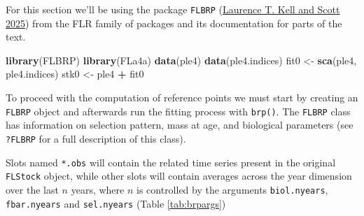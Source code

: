 \documentclass[
]{book}
\newenvironment{Shaded}{\begin{snugshade}}{\end{snugshade}}
\newcommand{\FunctionTok}[1]{\textcolor[rgb]{0.13,0.29,0.53}{\textbf{#1}}}
\newcommand{\NormalTok}[1]{#1}
\newcommand{\OtherTok}[1]{\textcolor[rgb]{0.56,0.35,0.01}{#1}}
\newcommand{\SpecialCharTok}[1]{\textcolor[rgb]{0.81,0.36,0.00}{\textbf{#1}}}
\begin{document}
For this section we'll be using the package \texttt{FLBRP} (\protect\hyperlink{ref-flbrp}{Laurence T. Kell and Scott 2025}) from the FLR family of packages and its documentation for parts of the text.

\begin{Shaded}
\begin{Highlighting}[]
\FunctionTok{library}\NormalTok{(FLBRP)}
\FunctionTok{library}\NormalTok{(FLa4a)}
\FunctionTok{data}\NormalTok{(ple4)}
\FunctionTok{data}\NormalTok{(ple4.indices)}
\NormalTok{fit0 }\OtherTok{\textless{}{-}} \FunctionTok{sca}\NormalTok{(ple4, ple4.indices)}
\NormalTok{stk0 }\OtherTok{\textless{}{-}}\NormalTok{ ple4 }\SpecialCharTok{+}\NormalTok{ fit0}
\end{Highlighting}
\end{Shaded}

To proceed with the computation of reference points we must start by creating an \texttt{FLBRP} object and afterwards run the fitting process with \texttt{brp()}. The \texttt{FLBRP} class has information on selection pattern, mass at age, and biological parameters (see \texttt{?FLBRP} for a full description of this class).

Slots named \texttt{*.obs} will contain the related time series present in the original \texttt{FLStock} object, while other slots will contain averages across the year dimension over the last \(n\) years, where \(n\) is controlled by the arguments \texttt{biol.nyears}, \texttt{fbar.nyears} and \texttt{sel.nyears} (Table \ref{tab:brpargs})
\end{document}
